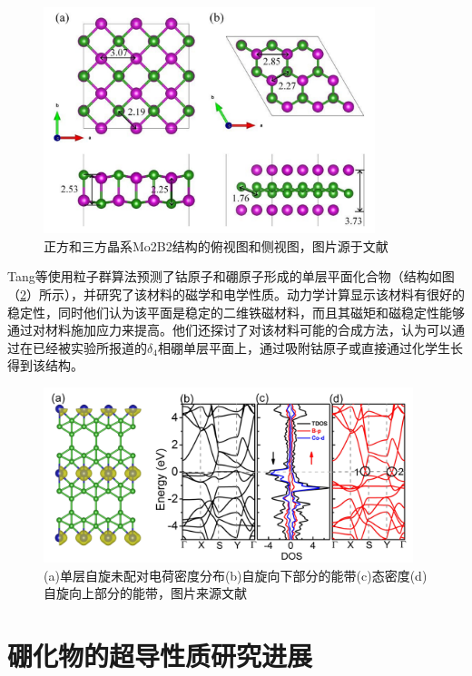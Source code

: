 \begin{figure}
  \includegraphics[width=0.86\textwidth]{figs/ch1_mo2b2.png}
  \centering
  \caption{正方和三方晶系Mo2B2结构的俯视图和侧视图，图片源于文献\cite{bo2019tetragonal}}
  \label{fig:ch1_mo2b2}
\end{figure}

Tang等\cite{tang2019cob}使用粒子群算法预测了钴原子和硼原子形成的单层平面化合物（结构如图（\ref{fig:ch1_cob6}）所示），并研究了该材料的磁学和电学性质。动力学计算显示该材料有很好的稳定性，同时他们认为该平面是稳定的二维铁磁材料，而且其磁矩和磁稳定性能够通过对材料施加应力来提高。他们还探讨了对该材料可能的合成方法，认为可以通过在已经被实验所报道的$\delta_4$相硼单层平面上，通过吸附钴原子或直接通过化学生长得到该结构。

\begin{figure}
  \includegraphics[width=0.96\textwidth]{figs/ch1_cob6.png}
  \centering
  \caption{(a)单层自旋未配对电荷密度分布(b)自旋向下部分的能带(c)态密度(d)自旋向上部分的能带，图片来源文献\cite{tang2019cob}}
  \label{fig:ch1_cob6}
\end{figure}

\section{硼化物的超导性质研究进展}


